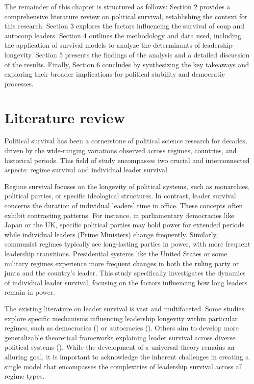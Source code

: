 \documentclass[
  12pt,
]{report}
\begin{document}
The remainder of this chapter is structured as follows: Section 2
provides a comprehensive literature review on political survival,
establishing the context for this research. Section 3 explores the
factors influencing the survival of coup and autocoup leaders. Section 4
outlines the methodology and data used, including the application of
survival models to analyze the determinants of leadership longevity.
Section 5 presents the findings of the analysis and a detailed
discussion of the results. Finally, Section 6 concludes by synthesizing
the key takeaways and exploring their broader implications for political
stability and democratic processes.

\section{Literature review}\label{literature-review}

Political survival has been a cornerstone of political science research
for decades, driven by the wide-ranging variations observed across
regimes, countries, and historical periods. This field of study
encompasses two crucial and interconnected aspects: regime survival and
individual leader survival.

Regime survival focuses on the longevity of political systems, such as
monarchies, political parties, or specific ideological structures. In
contrast, leader survival concerns the duration of individual leaders'
time in office. These concepts often exhibit contrasting patterns. For
instance, in parliamentary democracies like Japan or the UK, specific
political parties may hold power for extended periods while individual
leaders (Prime Ministers) change frequently. Similarly, communist
regimes typically see long-lasting parties in power, with more frequent
leadership transitions. Presidential systems like the United States or
some military regimes experience more frequent changes in both the
ruling party or junta and the country's leader. This study specifically
investigates the dynamics of individual leader survival, focusing on the
factors influencing how long leaders remain in power.

The existing literature on leader survival is vast and multifaceted.
Some studies explore specific mechanisms influencing leadership
longevity within particular regimes, such as democracies
() or autocracies
(). Others aim to develop more generalizable theoretical frameworks
explaining leader survival across diverse political systems
().
While the development of a universal theory remains an alluring goal, it
is important to acknowledge the inherent challenges in creating a single
model that encompasses the complexities of leadership survival across
all regime types.
\end{document}
